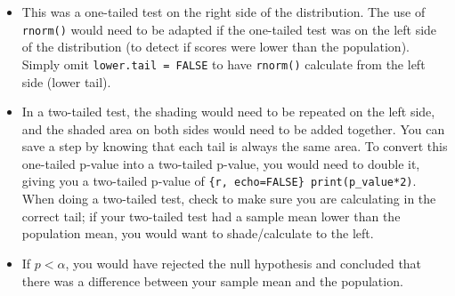 \documentclass[
]{book}
\begin{document}
\begin{itemize}
\item
  This was a one-tailed test on the right side of the distribution. The use of \texttt{rnorm()} would need to be adapted if the one-tailed test was on the left side of the distribution (to detect if scores were lower than the population). Simply omit \texttt{lower.tail\ =\ FALSE} to have \texttt{rnorm()} calculate from the left side (lower tail).
\item
  In a two-tailed test, the shading would need to be repeated on the left side, and the shaded area on both sides would need to be added together. You can save a step by knowing that each tail is always the same area. To convert this one-tailed p-value into a two-tailed p-value, you would need to double it, giving you a two-tailed p-value of \texttt{\{r,\ echo=FALSE\}\ print(p\_value*2)}. When doing a two-tailed test, check to make sure you are calculating in the correct tail; if your two-tailed test had a sample mean lower than the population mean, you would want to shade/calculate to the left.
\item
  If \(p < \alpha\), you would have rejected the null hypothesis and concluded that there was a difference between your sample mean and the population.
\end{itemize}

  
\end{document}
